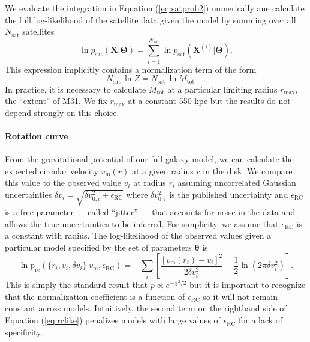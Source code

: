 \documentclass[preprint,12pt]{aastex}
\newcommand{\eqlabel}[1]{\label{eq:#1}}
\newcommand{\eq}[1]{Equation (\ref{eq:#1})}
\newcommand{\bvec}[1]{\ensuremath{\boldsymbol{#1}}}
\renewcommand{\vector}[1]{\ensuremath{\bvec{#1}}}
\newcommand{\model}{\vector{\Theta}}
\newcommand{\data}{\vector{X}}
\newcommand{\prob}{\ensuremath{p}}
\newcommand{\pr}{\prob}
\newcommand{\sat}{\mathrm{sat}}
\begin{document}
We evaluate the integration in \eq{satprob2}  numerically ane calculate
the full log-likelihood of the satellite data given the model by summing
over all $N_\sat$ satellites
\begin{equation}
    \ln \pr_\sat (\data | \model)
        = \sum_{i=1}^{N_\sat} \ln \pr_\sat (\data^{(i)} | \model).
\end{equation}
This expression implicitly contains a normalization term of the form
\begin{equation}
    N_\sat \, \ln Z = N_\sat \, \ln M_\mathrm{tot} \quad .
\end{equation}
In practice, it is necessary to calculate $M_\mathrm{tot}$ at a particular
limiting radius $r_\mathrm{max}$, the ``extent'' of M31. We fix
$r_\mathrm{max}$ at a constant 550 kpc but the results do not depend
strongly on this choice.

\paragraph{Rotation curve}

From the gravitational potential of our full galaxy model, we can calculate the
expected circular velocity $v_\mathrm{m}(r)$ at a given radius $r$ in the disk.
We compare this value to the observed value $v_i$ at radius $r_i$ assuming
uncorrelated Gaussian uncertainties
$\delta v_i = \sqrt{\delta v_{0,i}^2 + \epsilon_\mathrm{RC}}$ where
$\delta v_{0,i}^2$ is the published uncertainty and $\epsilon_\mathrm{RC}$ is a
free parameter --- called ``jitter'' --- that accounts for noise in the data and
allows the true uncertainties to be inferred.  For simplicity, we assume that
$\epsilon_\mathrm{RC}$ is a constant with radius.  The log-likelihood of the
observed values given a particular model specified by the set of parameters
$\mathbf{\theta}$ is
\begin{equation}
    \eqlabel{rclike}
    \ln \mathrm{p}_\mathrm{rc} (\{ r_i, v_i, \delta v_i \}| v_\mathrm{m},
    \epsilon_\mathrm{RC}) = - \sum_i \left [ \frac{[v_\mathrm{m}(r_i) - v_i]^2}
        {2 \delta v_i ^2} - \frac{1}{2} \ln (2 \pi \delta v_i ^2) \right ].
\end{equation}
This is simply the standard result that $p \propto e^{-\chi^2/2}$ but it is
important to recognize that the normalization coefficient is a function of
$\epsilon_\mathrm{RC}$ so it will not remain constant across models.
Intuitively, the second term on the righthand side of \eq{rclike} penalizes
models with large values of $\epsilon_\mathrm{RC}$ for a lack of specificity.
\end{document}
